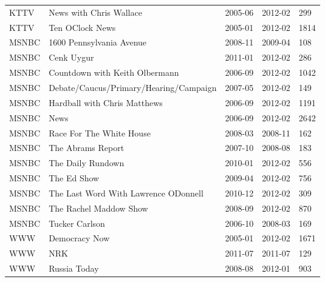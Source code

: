 \begin{longtable}{lllll}
\addlinespace
KTTV & News with Chris Wallace & 2005-06 & 2012-02 & 299\\
KTTV & Ten OClock News & 2005-01 & 2012-02 & 1814\\
MSNBC & 1600 Pennsylvania Avenue & 2008-11 & 2009-04 & 108\\
MSNBC & Cenk Uygur & 2011-01 & 2012-02 & 286\\
MSNBC & Countdown with Keith Olbermann & 2006-09 & 2012-02 & 1042\\
\addlinespace
MSNBC & Debate/Caucus/Primary/Hearing/Campaign & 2007-05 & 2012-02 & 149\\
MSNBC & Hardball with Chris Matthews & 2006-09 & 2012-02 & 1191\\
MSNBC & News & 2006-09 & 2012-02 & 2642\\
MSNBC & Race For The White House & 2008-03 & 2008-11 & 162\\
MSNBC & The Abrams Report & 2007-10 & 2008-08 & 183\\
\addlinespace
MSNBC & The Daily Rundown & 2010-01 & 2012-02 & 556\\
MSNBC & The Ed Show & 2009-04 & 2012-02 & 756\\
MSNBC & The Last Word With Lawrence ODonnell & 2010-12 & 2012-02 & 309\\
MSNBC & The Rachel Maddow Show & 2008-09 & 2012-02 & 870\\
MSNBC & Tucker Carlson & 2006-10 & 2008-03 & 169\\
\addlinespace
WWW & Democracy Now & 2005-01 & 2012-02 & 1671\\
WWW & NRK & 2011-07 & 2011-07 & 129\\
WWW & Russia Today & 2008-08 & 2012-01 & 903\\*
\end{longtable}

